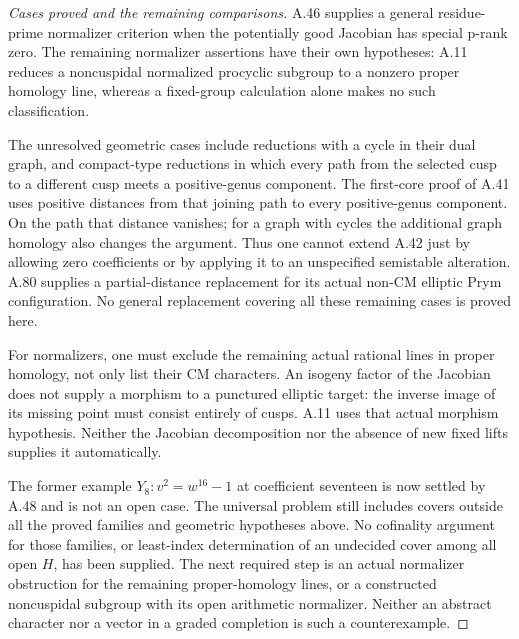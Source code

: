 \begin{proof}[Cases proved and the remaining comparisons]
A.46 supplies a general
residue-prime normalizer criterion when the potentially good
Jacobian has special p-rank zero. The remaining
normalizer assertions have their own hypotheses: A.11 reduces
a noncuspidal normalized procyclic subgroup to a nonzero proper
homology line, whereas a fixed-group calculation alone makes
no such classification.

The unresolved geometric cases include reductions with a cycle
in their dual graph, and compact-type reductions in which every
path from the selected cusp to a different cusp meets a
positive-genus component. The first-core proof of A.41 uses
positive distances from that joining path to every positive-genus
component. On the path that distance vanishes; for a graph with
cycles the additional graph homology also changes the argument.
Thus one cannot extend A.42 just by allowing zero coefficients
or by applying it to an unspecified semistable alteration.
A.80 supplies a partial-distance replacement for its actual non-CM
elliptic Prym configuration. No general replacement covering all
these remaining cases is proved here.

For normalizers, one must exclude the remaining actual rational
lines in proper homology, not only list their CM characters.
An isogeny factor of the Jacobian does not supply a morphism to
a punctured elliptic target: the inverse image of its missing
point must consist entirely of cusps. A.11 uses that actual
morphism hypothesis. Neither the Jacobian decomposition nor
the absence of new fixed lifts supplies it automatically.

The former example \(Y_8:v^2=w^{16}-1\) at coefficient
seventeen is now settled by A.48 and is not an open case.
The universal problem still includes covers outside all the
proved families and geometric hypotheses above. No cofinality
argument for those families, or least-index determination of
an undecided cover among all open \(H\), has been supplied.
The next required step is an actual normalizer obstruction for
the remaining proper-homology lines, or a constructed noncuspidal
subgroup with its open arithmetic normalizer. Neither an
abstract character nor a vector in a graded completion is such
a counterexample.
\end{proof}
